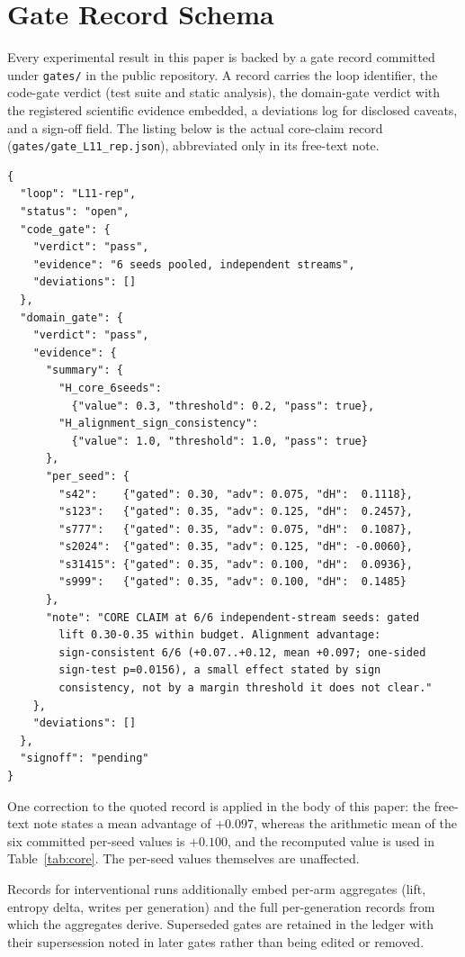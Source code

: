 \section{Gate Record Schema}
\label{app:schema}

Every experimental result in this paper is backed by a gate record committed under \texttt{gates/} in the public repository. A record carries the loop identifier, the code-gate verdict (test suite and static analysis), the domain-gate verdict with the registered scientific evidence embedded, a deviations log for disclosed caveats, and a sign-off field. The listing below is the actual core-claim record (\texttt{gates/gate\_L11\_rep.json}), abbreviated only in its free-text note.

\begin{verbatim}
{
  "loop": "L11-rep",
  "status": "open",
  "code_gate": {
    "verdict": "pass",
    "evidence": "6 seeds pooled, independent streams",
    "deviations": []
  },
  "domain_gate": {
    "verdict": "pass",
    "evidence": {
      "summary": {
        "H_core_6seeds":
          {"value": 0.3, "threshold": 0.2, "pass": true},
        "H_alignment_sign_consistency":
          {"value": 1.0, "threshold": 1.0, "pass": true}
      },
      "per_seed": {
        "s42":    {"gated": 0.30, "adv": 0.075, "dH":  0.1118},
        "s123":   {"gated": 0.35, "adv": 0.125, "dH":  0.2457},
        "s777":   {"gated": 0.35, "adv": 0.075, "dH":  0.1087},
        "s2024":  {"gated": 0.35, "adv": 0.125, "dH": -0.0060},
        "s31415": {"gated": 0.35, "adv": 0.100, "dH":  0.0936},
        "s999":   {"gated": 0.35, "adv": 0.100, "dH":  0.1485}
      },
      "note": "CORE CLAIM at 6/6 independent-stream seeds: gated
        lift 0.30-0.35 within budget. Alignment advantage:
        sign-consistent 6/6 (+0.07..+0.12, mean +0.097; one-sided
        sign-test p=0.0156), a small effect stated by sign
        consistency, not by a margin threshold it does not clear."
    },
    "deviations": []
  },
  "signoff": "pending"
}
\end{verbatim}

One correction to the quoted record is applied in the body of this paper: the free-text note states a mean advantage of $+0.097$, whereas the arithmetic mean of the six committed per-seed values is $+0.100$, and the recomputed value is used in Table~\ref{tab:core}. The per-seed values themselves are unaffected.

Records for interventional runs additionally embed per-arm aggregates (lift, entropy delta, writes per generation) and the full per-generation records from which the aggregates derive. Superseded gates are retained in the ledger with their supersession noted in later gates rather than being edited or removed.

